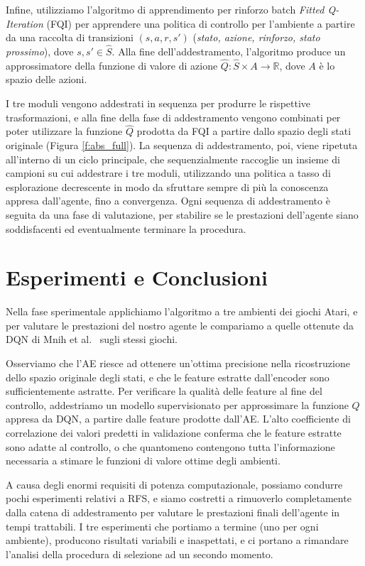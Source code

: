 Infine, utilizziamo l'algoritmo di apprendimento per rinforzo batch 
\textit{Fitted Q-Iteration} (FQI) \cite{ernst2005tree} per apprendere una 
politica  di controllo per l'ambiente a partire da una raccolta di transizioni 
$(s, a, r, s')$ (\textit{stato, azione, rinforzo, stato prossimo}), dove 
$s, s' \in \hat{S}$. Alla fine dell'addestramento, l'algoritmo produce un 
approssimatore della funzione di valore di azione $\hat{Q}: \hat{S} \times A \rightarrow \mathbb{R}$, 
dove $A$ \`e lo spazio delle azioni. 

I tre moduli vengono addestrati in sequenza per produrre le rispettive 
trasformazioni, e alla fine della fase di addestramento vengono combinati 
per poter utilizzare la funzione $\hat{Q}$ prodotta da FQI a partire dallo
spazio degli stati originale (Figura \ref{f:abs_full}).
La sequenza di addestramento, poi, viene ripetuta all'interno
di un ciclo principale, che sequenzialmente raccoglie un insieme di campioni
su cui addestrare i tre moduli, utilizzando una politica a tasso di esplorazione
decrescente in modo da sfruttare sempre di pi\`u la conoscenza appresa 
dall'agente, fino a convergenza. Ogni sequenza di addestramento \`e seguita
da una fase di valutazione, per stabilire se le prestazioni dell'agente siano
soddisfacenti ed eventualmente terminare la procedura. 

\section*{Esperimenti e Conclusioni}
Nella fase sperimentale applichiamo l'algoritmo a tre ambienti dei giochi Atari,
e per valutare le prestazioni del nostro agente le compariamo a quelle ottenute
da DQN di Mnih et al.\ \cite{mnih2015human} sugli stessi giochi.

Osserviamo che l'AE riesce ad ottenere un'ottima precisione nella ricostruzione 
dello spazio originale degli stati, e che le feature estratte dall'encoder 
sono sufficientemente astratte.
Per verificare la qualit\`a delle feature al fine del controllo, addestriamo un 
modello supervisionato per approssimare la funzione $Q$ appresa da DQN, a 
partire dalle feature prodotte dall'AE. 
L'alto coefficiente di correlazione dei valori predetti in validazione conferma 
che le feature estratte sono adatte al controllo, o che quantomeno contengono 
tutta l'informazione necessaria a stimare le funzioni di valore ottime 
degli ambienti. 

A causa degli enormi requisiti di potenza computazionale, possiamo 
condurre pochi esperimenti relativi a RFS, e siamo costretti a rimuoverlo 
completamente dalla catena di addestramento per valutare le prestazioni
finali dell'agente in tempi trattabili. 
I tre esperimenti che portiamo a termine (uno per ogni ambiente), producono 
risultati variabili e inaspettati, e ci portano a rimandare l'analisi della
procedura di selezione ad un secondo momento. 

